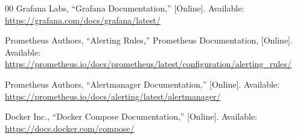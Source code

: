 \documentclass[conference]{IEEEtran}
\begin{document}
\begin{thebibliography}{00}
Grafana Labs, ``Grafana Documentation,''
[Online]. Available:
\url{https://grafana.com/docs/grafana/latest/}

Prometheus Authors, ``Alerting Rules,''
Prometheus Documentation, [Online]. Available:
\url{https://prometheus.io/docs/prometheus/latest/configuration/alerting_rules/}

Prometheus Authors, ``Alertmanager Documentation,''
[Online]. Available:
\url{https://prometheus.io/docs/alerting/latest/alertmanager/}

Docker Inc., ``Docker Compose Documentation,''
[Online]. Available:
\url{https://docs.docker.com/compose/}

\end{thebibliography}
\end{document}
